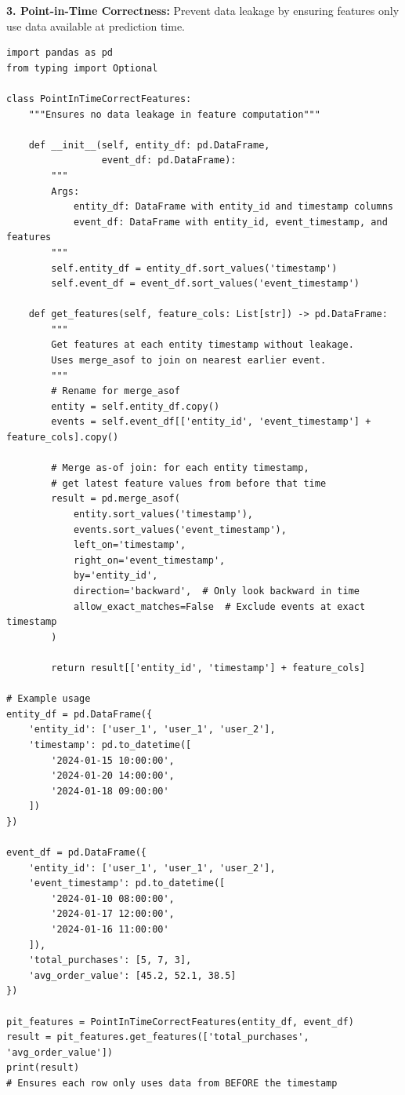 \textbf{3. Point-in-Time Correctness:} Prevent data leakage by ensuring features only use data available at prediction time.

\begin{lstlisting}[style=python, caption=Point-in-time correct feature computation]
import pandas as pd
from typing import Optional

class PointInTimeCorrectFeatures:
    """Ensures no data leakage in feature computation"""

    def __init__(self, entity_df: pd.DataFrame,
                 event_df: pd.DataFrame):
        """
        Args:
            entity_df: DataFrame with entity_id and timestamp columns
            event_df: DataFrame with entity_id, event_timestamp, and features
        """
        self.entity_df = entity_df.sort_values('timestamp')
        self.event_df = event_df.sort_values('event_timestamp')

    def get_features(self, feature_cols: List[str]) -> pd.DataFrame:
        """
        Get features at each entity timestamp without leakage.
        Uses merge_asof to join on nearest earlier event.
        """
        # Rename for merge_asof
        entity = self.entity_df.copy()
        events = self.event_df[['entity_id', 'event_timestamp'] + feature_cols].copy()

        # Merge as-of join: for each entity timestamp,
        # get latest feature values from before that time
        result = pd.merge_asof(
            entity.sort_values('timestamp'),
            events.sort_values('event_timestamp'),
            left_on='timestamp',
            right_on='event_timestamp',
            by='entity_id',
            direction='backward',  # Only look backward in time
            allow_exact_matches=False  # Exclude events at exact timestamp
        )

        return result[['entity_id', 'timestamp'] + feature_cols]

# Example usage
entity_df = pd.DataFrame({
    'entity_id': ['user_1', 'user_1', 'user_2'],
    'timestamp': pd.to_datetime([
        '2024-01-15 10:00:00',
        '2024-01-20 14:00:00',
        '2024-01-18 09:00:00'
    ])
})

event_df = pd.DataFrame({
    'entity_id': ['user_1', 'user_1', 'user_2'],
    'event_timestamp': pd.to_datetime([
        '2024-01-10 08:00:00',
        '2024-01-17 12:00:00',
        '2024-01-16 11:00:00'
    ]),
    'total_purchases': [5, 7, 3],
    'avg_order_value': [45.2, 52.1, 38.5]
})

pit_features = PointInTimeCorrectFeatures(entity_df, event_df)
result = pit_features.get_features(['total_purchases', 'avg_order_value'])
print(result)
# Ensures each row only uses data from BEFORE the timestamp
\end{lstlisting}

